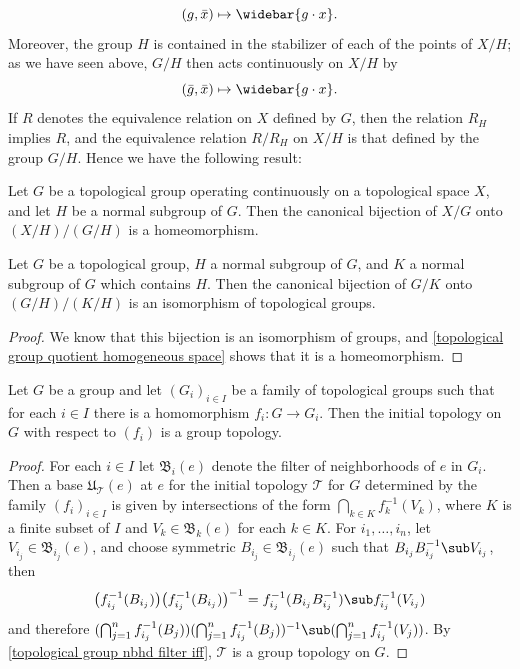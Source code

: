 \[(g,\bar{x})\mapsto\widebar{g\cdot x}.\]
Moreover, the group $H$ is contained in the stabilizer of each of the points of $X/H$; as we have seen above, $G/H$ then acts continuously on $X/H$ by
\[(\bar{g},\bar{x})\mapsto\widebar{g\cdot x}.\]
If $R$ denotes the equivalence relation on $X$ defined by $G$, then the relation $R_H$ implies $R$, and the equivalence relation $R/R_H$ on $X/H$ is that defined by the group $G/H$. Hence we have the following result:
\begin{proposition}\label{topological group quotient homogeneous space}
Let $G$ be a topological group operating continuously on a topological space $X$, and let $H$ be a normal subgroup of $G$. Then the canonical bijection of $X/G$ onto $(X/H)/(G/H)$ is a homeomorphism.
\end{proposition}
\begin{corollary}\label{topological group second isomorphism thm}
Let $G$ be a topological group, $H$ a normal subgroup of $G$, and $K$ a normal subgroup of $G$ which contains $H$. Then the canonical bijection of $G/K$ onto $(G/H)/(K/H)$ is an isomorphism of topological groups.
\end{corollary}
\begin{proof}
We know that this bijection is an isomorphism of groups, and \cref{topological group quotient homogeneous space} shows that it is a homeomorphism.
\end{proof}
\begin{proposition}
Let $G$ be a group and let $(G_i)_{i\in I}$ be a family of topological groups such that for each $i\in I$ there is a homomorphism $f_i:G\to G_i$. Then the initial topology on $G$ with respect to $(f_i)$ is a group topology.
\end{proposition}
\begin{proof}
For each $i\in I$ let $\mathfrak{B}_i(e)$ denote the filter of neighborhoods of $e$ in $G_i$. Then a base $\mathfrak{U}_{\mathcal{T}}(e)$ at $e$ for the initial topology $\mathcal{T}$ for $G$ determined by the family $(f_i)_{i\in I}$ is given by intersections of the form $\bigcap_{k\in K}f_k^{-1}(V_k)$, where $K$ is a finite subset of $I$ and $V_k\in\mathfrak{B}_k(e)$ for each $k\in K$. For $i_1,\dots,i_n$, let $V_{i_j}\in\mathfrak{B}_{i_j}(e)$, and choose symmetric $B_{i_j}\in\mathfrak{B}_{i_j}(e)$ such that $B_{i_j}B_{i_j}^{-1}\sub V_{i_j}$, then
\[\big(f_{i_j}^{-1}(B_{i_j})\big)\big(f_{i_j}^{-1}(B_{i_j})\big)^{-1}=f_{i_j}^{-1}(B_{i_j}B_{i_j}^{-1})\sub f_{i_j}^{-1}(V_{i_j})\]
and therefore $(\bigcap_{j=1}^{n}f_{i_j}^{-1}(B_j))(\bigcap_{j=1}^{n}f_{i_j}^{-1}(B_j))^{-1}\sub(\bigcap_{j=1}^{n}f_{i_j}^{-1}(V_j))$. By \cref{topological group nbhd filter iff}, $\mathcal{T}$ is a group topology on $G$.
\end{proof}
